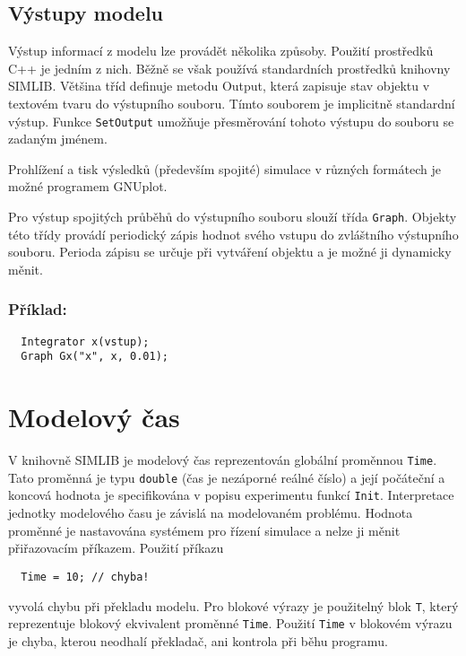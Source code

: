 \documentclass[a4paper]{article}
\begin{document}
\subsection{Výstupy modelu}

Výstup informací z modelu lze provádět několika způsoby. Použití
prostředků C++ je jedním z nich. Běžně se však používá
standardních prostředků knihovny SIMLIB. Většina tříd definuje
metodu Output, která zapisuje stav objektu v textovém tvaru do
výstupního souboru. Tímto souborem je implicitně standardní
výstup. Funkce \verb|SetOutput| umožňuje přesměrování
tohoto výstupu do souboru se zadaným jménem.

Prohlížení a tisk výsledků (především spojité) simulace  v různých formátech
je možné programem GNUplot. 



Pro výstup spojitých průběhů do výstupního souboru slouží třída \verb|Graph|.
Objekty této třídy provádí periodický zápis hodnot svého vstupu do zvláštního
výstupního souboru. Perioda zápisu se určuje při vytváření objektu a je možné
ji dynamicky měnit.

\subsubsection*{Příklad:}

\begin{verbatim}
  Integrator x(vstup);
  Graph Gx("x", x, 0.01);
\end{verbatim}


\section{Modelový čas}

V knihovně SIMLIB je modelový čas reprezentován globální
proměnnou \verb|Time|. Tato proměnná je typu \verb|double| (čas je nezáporné
reálné číslo) a její počáteční a koncová hodnota je
specifikována v popisu experimentu funkcí \verb|Init|. Interpretace
jednotky modelového času je závislá na modelovaném problému.
Hodnota proměnné je nastavována systémem pro řízení
simulace a nelze ji měnit přiřazovacím příkazem. Použití příkazu

\begin{verbatim}
  Time = 10; // chyba!
\end{verbatim}

vyvolá chybu při překladu modelu. Pro blokové výrazy je použitelný blok
\verb|T|, který reprezentuje blokový ekvivalent proměnné \verb|Time|.
Použití \verb|Time| v blokovém výrazu je chyba, kterou neodhalí překladač,
ani kontrola při běhu programu.
\end{document}
